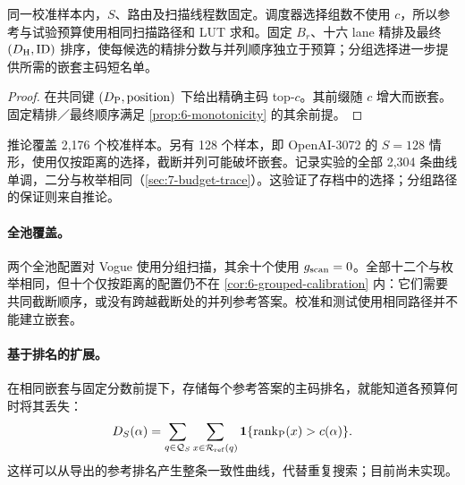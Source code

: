 同一校准样本内，$S$、路由及扫描线程数固定。调度器选择组数不使用 $c$，所以参考与试验预算使用相同扫描路径和 LUT 求和。固定 $B_r$、十六 lane 精排及最终 $(D_{\mathrm{H}},\mathrm{ID})$ 排序，使每候选的精排分数与并列顺序独立于预算；分组选择进一步提供所需的嵌套主码短名单。

\par\addvspace{7pt}\noindent\begin{minipage}{\linewidth}
\begin{proof}
 在共同键 $(D_{\mathrm{P}},\mathrm{position})$ 下给出精确主码 top-$c$。其前缀随 $c$ 增大而嵌套。固定精排／最终顺序满足 \cref{prop:6-monotonicity} 的其余前提。
\end{proof}
\end{minipage}\par\medskip
推论覆盖 2,176 个校准样本。另有 128 个样本，即 OpenAI-3072 的 $S=128$ 情形，使用仅按距离的选择，截断并列可能破坏嵌套。记录实验的全部 2,304 条曲线单调，二分与枚举相同（\cref{sec:7-budget-trace}）。这验证了存档中的选择；分组路径的保证则来自推论。

\paragraph{全池覆盖。}
两个全池配置对 Vogue 使用分组扫描，其余十个使用 $g_{\mathrm{scan}}=0$。全部十二个与枚举相同，但十个仅按距离的配置仍不在 \cref{cor:6-grouped-calibration} 内：它们需要共同截断顺序，或没有跨越截断处的并列参考答案。校准和测试使用相同路径并不能建立嵌套。

\paragraph{基于排名的扩展。}
在相同嵌套与固定分数前提下，存储每个参考答案的主码排名，就能知道各预算何时将其丢失：
\begin{equation}
 D_S(\alpha)=\sum_{q\in\mathcal Q_S}\sum_{x\in\mathcal R_{\rm ref}(q)}
 \mathbf1\{\operatorname{rank}_{\rm P}(x)>c(\alpha)\}.
 \label{eq:6-rank-curve}
\end{equation}
这样可以从导出的参考排名产生整条一致性曲线，代替重复搜索；目前尚未实现。
